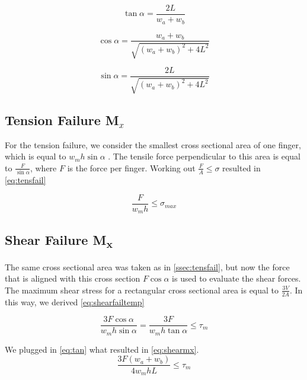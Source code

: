 \begin{equation}
	\label{eq:tan}
	\tan \alpha = \frac{2L}{w_a + w_b}
\end{equation}

\begin{equation}
	\label{eq:cos}
	\cos \alpha = \frac{w_a + w_b}{\sqrt{ \left( w_a + w_b \right) ^2 + 4L ^2 }}
\end{equation}

\begin{equation}
	\label{eq:sin}
	\sin \alpha = \frac{2L}{\sqrt{ \left( w_a + w_b \right) ^2 + 4L ^2 }}
\end{equation}


\subsection{Tension Failure M$_x$}\label{ssec:tensfail}
For the tension failure, we consider the smallest cross sectional area of one finger, which is equal to $w_m h \sin \alpha$ . The tensile force perpendicular to this area is equal to $\frac{F}{\sin \alpha}$, where $F$ is the force per finger. %
Working out $\frac{F}{A} \le \sigma$ resulted in \autoref{eq:tensfail}


\begin{equation}
		\label{eq:tensfail}
	\frac{F}{w_m  h} \le \sigma_{max}
\end{equation}


\subsection{Shear Failure M\textsubscript{x}}
The same cross sectional area was taken as in \autoref{ssec:tensfail}, but now the force that is aligned with this cross section $F \cos \alpha$ is used to evaluate the shear forces. The maximum shear stress for a rectangular cross sectional area is equal to $\frac{3V}{2A}$. In this way, we derived \autoref{eq:shearfailtemp}

\begin{equation}
	\label{eq:shearfailtemp}
	\frac{3F \cos \alpha}{w_m h \sin \alpha} = \frac{3F }{w_m h \tan \alpha} \le \tau_m
\end{equation}

We plugged in \autoref{eq:tan} what resulted in \autoref{eq:shearmx}.
\begin{equation}
	\label{eq:shearmx}
	\frac{ 3 F \left(w_a + w_b \right) }{ 4  w_m h L} \le \tau_m	
\end{equation}

